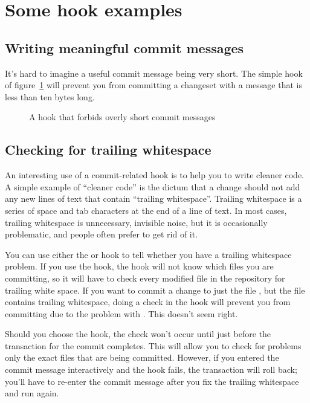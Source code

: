 \section{Some hook examples}

\subsection{Writing meaningful commit messages}

It's hard to imagine a useful commit message being very short.  The
simple  hook of figure~\ref{ex:hook:msglen.run}
will prevent you from committing a changeset with a message that is
less than ten bytes long.

\begin{figure}[ht]
  \caption{A hook that forbids overly short commit messages}
  \label{ex:hook:msglen.run}
\end{figure}

\subsection{Checking for trailing whitespace}

An interesting use of a commit-related hook is to help you to write
cleaner code.  A simple example of ``cleaner code'' is the dictum that
a change should not add any new lines of text that contain ``trailing
whitespace''.  Trailing whitespace is a series of space and tab
characters at the end of a line of text.  In most cases, trailing
whitespace is unnecessary, invisible noise, but it is occasionally
problematic, and people often prefer to get rid of it.

You can use either the  or  hook to
tell whether you have a trailing whitespace problem.  If you use the
 hook, the hook will not know which files you are
committing, so it will have to check every modified file in the
repository for trailing white space.  If you want to commit a change
to just the file , but the file  contains
trailing whitespace, doing a check in the  hook will
prevent you from committing  due to the problem with
.  This doesn't seem right.

Should you choose the  hook, the check won't occur
until just before the transaction for the commit completes.  This will
allow you to check for problems only the exact files that are being
committed.  However, if you entered the commit message interactively
and the hook fails, the transaction will roll back; you'll have to
re-enter the commit message after you fix the trailing whitespace and
run  again.

